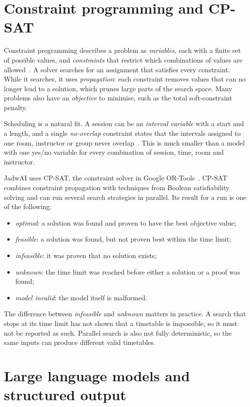 \section{Constraint programming and CP-SAT}\label{bg-cp}

Constraint programming describes a problem as \emph{variables}, each with a finite set of possible values, and \emph{constraints} that restrict which combinations of values are allowed~\cite{rossi2006handbook}. A solver searches for an assignment that satisfies every constraint. While it searches, it uses \emph{propagation}: each constraint removes values that can no longer lead to a solution, which prunes large parts of the search space. Many problems also have an \emph{objective} to minimise, such as the total soft-constraint penalty.

Scheduling is a natural fit. A session can be an \emph{interval variable} with a start and a length, and a single \emph{no-overlap} constraint states that the intervals assigned to one room, instructor or group never overlap~\cite{rossi2006handbook}. This is much smaller than a model with one yes/no variable for every combination of session, time, room and instructor.

JadwAI uses CP-SAT, the constraint solver in Google OR-Tools~\cite{google_cpsat}. CP-SAT combines constraint propagation with techniques from Boolean satisfiability solving and can run several search strategies in parallel. Its result for a run is one of the following:
\begin{itemize}
\item \emph{optimal}: a solution was found and proven to have the best objective value;
\item \emph{feasible}: a solution was found, but not proven best within the time limit;
\item \emph{infeasible}: it was proven that no solution exists;
\item \emph{unknown}: the time limit was reached before either a solution or a proof was found;
\item \emph{model invalid}: the model itself is malformed.
\end{itemize}
The difference between \emph{infeasible} and \emph{unknown} matters in practice. A search that stops at its time limit has not shown that a timetable is impossible, so it must not be reported as such. Parallel search is also not fully deterministic, so the same inputs can produce different valid timetables.

\section{Large language models and structured output}\label{bg-llm}

